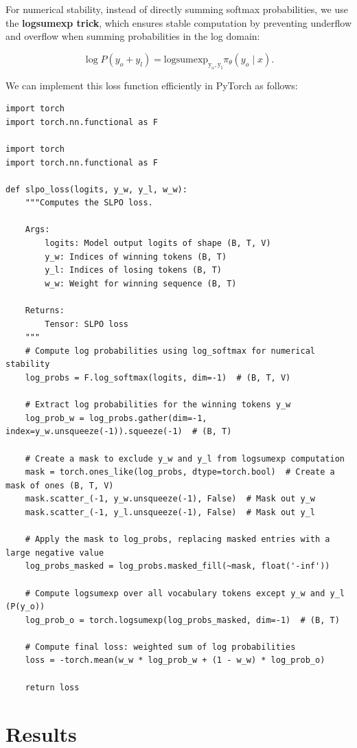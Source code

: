 \documentclass[twoside,11pt]{article}
\begin{document}
For numerical stability, instead of directly summing softmax probabilities, we use the \textbf{logsumexp trick}, which ensures stable computation by preventing underflow and overflow when summing probabilities in the log domain:

\[
\log P(y_o + y_l) = \mathrm{logsumexp_{y_o, y_l}} \pi_\theta(y_o \mid x).
\]

We can implement this loss function efficiently in PyTorch as follows:

\begin{verbatim}
import torch
import torch.nn.functional as F

import torch
import torch.nn.functional as F

def slpo_loss(logits, y_w, y_l, w_w):
    """Computes the SLPO loss.

    Args:
        logits: Model output logits of shape (B, T, V)
        y_w: Indices of winning tokens (B, T)
        y_l: Indices of losing tokens (B, T)
        w_w: Weight for winning sequence (B, T)
    
    Returns:
        Tensor: SLPO loss
    """
    # Compute log probabilities using log_softmax for numerical stability
    log_probs = F.log_softmax(logits, dim=-1)  # (B, T, V)

    # Extract log probabilities for the winning tokens y_w
    log_prob_w = log_probs.gather(dim=-1, index=y_w.unsqueeze(-1)).squeeze(-1)  # (B, T)

    # Create a mask to exclude y_w and y_l from logsumexp computation
    mask = torch.ones_like(log_probs, dtype=torch.bool)  # Create a mask of ones (B, T, V)
    mask.scatter_(-1, y_w.unsqueeze(-1), False)  # Mask out y_w
    mask.scatter_(-1, y_l.unsqueeze(-1), False)  # Mask out y_l

    # Apply the mask to log_probs, replacing masked entries with a large negative value
    log_probs_masked = log_probs.masked_fill(~mask, float('-inf'))

    # Compute logsumexp over all vocabulary tokens except y_w and y_l (P(y_o))
    log_prob_o = torch.logsumexp(log_probs_masked, dim=-1)  # (B, T)

    # Compute final loss: weighted sum of log probabilities
    loss = -torch.mean(w_w * log_prob_w + (1 - w_w) * log_prob_o)

    return loss
\end{verbatim}


\section{Results}
\end{document}
